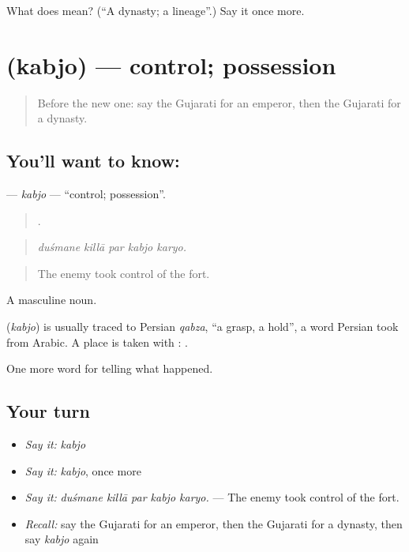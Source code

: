 \begin{tcolorbox}[breakable,colback=teal!4,colframe=teal!35!black,title={Before you move on}]
What does  mean? (\textquotedblleft{}A dynasty; a lineage\textquotedblright{}.) Say it once more.
\end{tcolorbox}
\section[\texorpdfstring{\gu{કબજો} (kabjo)}{કબજો (kabjo)}]{ (kabjo) — control; possession}

\label{lesson:GU-C324-kabjo}



\begin{quote}
Before the new one: say the Gujarati for an emperor, then the Gujarati for a dynasty.
\end{quote}

\subsection*{You'll want to know: }
\textbf{} — \emph{kabjo} — \textquotedblleft{}control; possession\textquotedblright{}.

\begin{quote}
    .
\end{quote}

\begin{quote}
\emph{duśmane killā par kabjo karyo.}
\end{quote}

\begin{quote}
The enemy took control of the fort.
\end{quote}

A masculine noun.

\begin{cousinweb}
\textbf{} (\emph{kabjo}) is usually traced to Persian \emph{qabza}, \textquotedblleft{}a grasp, a hold\textquotedblright{}, a word Persian took from Arabic. A place is taken with \textbf{}: \textbf{   }.
\end{cousinweb}

\begin{grammarlens}[title={What you've built}]
One more word for telling what happened.
\end{grammarlens}

\subsection*{Your turn}
\begin{itemize}
\raggedright
  \item \emph{Say it:} \emph{kabjo}
  \item \emph{Say it:} \emph{kabjo}, once more
  \item \emph{Say it:} \emph{duśmane killā par kabjo karyo.} — The enemy took control of the fort.
  \item \emph{Recall:} say the Gujarati for an emperor, then the Gujarati for a dynasty, then say \emph{kabjo} again
\end{itemize}

